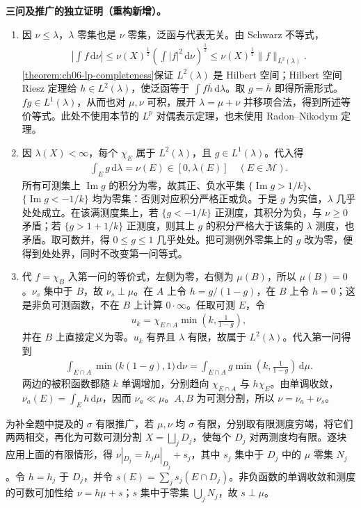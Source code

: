 \documentclass[../../main.tex]{subfiles}
\begin{document}
\begin{solution}
\textbf{三问及推广的独立证明（重构新增）。}
\begin{enumerate}
\item 因 $\nu\leqslant\lambda$，$\lambda$ 零集也是 $\nu$ 零集，泛函与代表无关。由 Schwarz 不等式，
\begin{align*}
\left|\int f\,\mathrm d\nu\right|
\leqslant\nu(X)^{\frac12}\left(\int|f|^2\,\mathrm d\nu\right)^{\frac12}
\leqslant\nu(X)^{\frac12}\|f\|_{L^2(\lambda)}.
\end{align*}
\cref{theorem:ch06-lp-completeness}保证 $L^2(\lambda)$ 是 Hilbert 空间；Hilbert 空间 Riesz 定理给 $h\in L^2(\lambda)$，使泛函等于 $\int f\overline h\,\mathrm d\lambda$。取 $g=\overline h$ 即得所需形式。$fg\in L^1(\lambda)$，从而也对 $\mu,\nu$ 可积，展开 $\lambda=\mu+\nu$ 并移项合法，得到所述等价等式。此处不使用本节的 $L^p$ 对偶表示定理，也未使用 Radon–Nikodym 定理。
\item 因 $\lambda(X)<\infty$，每个 $\chi_E$ 属于 $L^2(\lambda)$，且 $g\in L^1(\lambda)$。代入得
\begin{align*}
\int_Eg\,\mathrm d\lambda=\nu(E)\in[0,\lambda(E)]
\quad(E\in\mathscr M).
\end{align*}
所有可测集上 $\operatorname{Im}g$ 的积分为零，故其正、负水平集 $\{\operatorname{Im}g>1/k\}$、$\{\operatorname{Im}g<-1/k\}$ 均为零集：否则对应积分严格正或负。于是 $g$ 为实值，$\lambda$ 几乎处处成立。在该满测度集上，若 $\{g<-1/k\}$ 正测度，其积分为负，与 $\nu\geqslant0$ 矛盾；若 $\{g>1+1/k\}$ 正测度，则其上 $g$ 的积分严格大于该集的 $\lambda$ 测度，也矛盾。取可数并，得 $0\leqslant g\leqslant1$ 几乎处处。把可测例外零集上的 $g$ 改为零，便得到处处界，同时不改变第一问等式。
\item 代 $f=\chi_B$ 入第一问的等价式，左侧为零，右侧为 $\mu(B)$，所以 $\mu(B)=0$。$\nu_s$ 集中于 $B$，故 $\nu_s\perp\mu$。在 $A$ 上令 $h=g/(1-g)$，在 $B$ 上令 $h=0$；这是非负可测函数，不在 $B$ 上计算 $0\cdot\infty$。任取可测 $E$，令
\begin{align*}
u_k=\chi_{E\cap A}\min\left(k,\frac1{1-g}\right),
\end{align*}
并在 $B$ 上直接定义为零。$u_k$ 有界且 $\lambda$ 有限，故属于 $L^2(\lambda)$。代入第一问得到
\begin{align*}
\int_{E\cap A}\min\bigl(k(1-g),1\bigr)\,\mathrm d\nu
=\int_{E\cap A}g\min\left(k,\frac1{1-g}\right)\,\mathrm d\mu.
\end{align*}
两边的被积函数都随 $k$ 单调增加，分别趋向 $\chi_{E\cap A}$ 与 $h\chi_E$。由单调收敛，$\nu_a(E)=\int_Eh\,\mathrm d\mu$，因而 $\nu_a\ll\mu$。$A,B$ 为可测分割，所以 $\nu=\nu_a+\nu_s$。
\end{enumerate}
为补全题中提及的 $\sigma$ 有限推广，若 $\mu,\nu$ 均 $\sigma$ 有限，分别取有限测度穷竭，将它们两两相交，再化为可数可测分割 $X=\bigsqcup_jD_j$，使每个 $D_j$ 对两测度均有限。逐块应用上面的有限情形，得 $\nu|_{D_j}=h_j\mu|_{D_j}+s_j$，其中 $s_j$ 集中于 $D_j$ 中的 $\mu$ 零集 $N_j$。令 $h=h_j$ 于 $D_j$，并令 $s(E)=\sum_js_j(E\cap D_j)$。非负函数的单调收敛和测度的可数可加性给 $\nu=h\mu+s$；$s$ 集中于零集 $\bigcup_jN_j$，故 $s\perp\mu$。


\end{solution}
\end{document}
